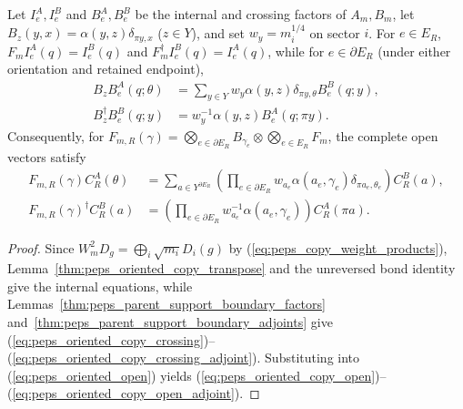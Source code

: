 \begin{lemma}%
    \label{thm:peps_oriented_copy_open}
    \leanok
    Let $I_e^A,I_e^B$ and $B_e^A,B_e^B$ be the internal and crossing factors of $A_m,B_m$, let $B_z(y,x)=\alpha(y,z)\delta_{\pi y,x}$ ($z\in Y$), and set $w_y=m_i^{1/4}$ on sector $i$. For $e\in E_R$, $F_mI_e^A(q)=I_e^B(q)$ and $F_m^\dagger I_e^B(q)=I_e^A(q)$, while for $e\in\partial E_R$ (under either orientation and retained endpoint),
    \begin{align}
        B_zB_e^A(q;\theta)
         & =\sum_{y\in Y}w_y\alpha(y,z)\delta_{\pi y,\theta}
        B_e^B(q;y),
        \label{eq:peps_oriented_copy_crossing}               \\
        B_z^\dagger B_e^B(q;y)
         & =w_y^{-1}\alpha(y,z)B_e^A(q;\pi y).
        \label{eq:peps_oriented_copy_crossing_adjoint}
    \end{align}
    Consequently, for $F_{m,R}(\gamma)=\bigotimes_{e\in\partial E_R}B_{\gamma_e}\otimes\bigotimes_{e\in E_R}F_m$, the complete open vectors satisfy
    \begin{align}
        F_{m,R}(\gamma)C_R^A(\theta)
         & =\sum_{a\in Y^{\partial E_R}}
        \left(\prod_{e\in\partial E_R}
        w_{a_e}\alpha(a_e,\gamma_e)\delta_{\pi a_e,\theta_e}\right)
        C_R^B(a),
        \label{eq:peps_oriented_copy_open} \\
        F_{m,R}(\gamma)^\dagger C_R^B(a)
         & =\left(\prod_{e\in\partial E_R}
        w_{a_e}^{-1}\alpha(a_e,\gamma_e)\right)
        C_R^A(\pi a).
        \label{eq:peps_oriented_copy_open_adjoint}
    \end{align}
\end{lemma}
\begin{proof}\leanok
    Since $W_m^2D_g=\bigoplus_i\sqrt{m_i}D_i(g)$ by (\ref{eq:peps_copy_weight_products}), Lemma~\ref{thm:peps_oriented_copy_transpose} and the unreversed bond identity give the internal equations, while Lemmas~\ref{thm:peps_parent_support_boundary_factors} and~\ref{thm:peps_parent_support_boundary_adjoints} give (\ref{eq:peps_oriented_copy_crossing})--(\ref{eq:peps_oriented_copy_crossing_adjoint}). Substituting into (\ref{eq:peps_oriented_open}) yields (\ref{eq:peps_oriented_copy_open})--(\ref{eq:peps_oriented_copy_open_adjoint}).
\end{proof}

